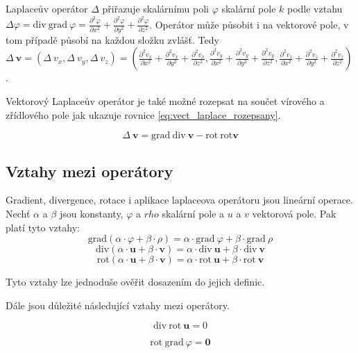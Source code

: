 \documentclass{book}
\newcommand{\vect}[1]{\boldsymbol{#1}}
\newcommand{\grad}{\mathrm{grad}}
\newcommand{\diverg}{\mathrm{div}}
\newcommand{\rot}{\mathrm{rot}}
\begin{document}
Laplaceův operátor \(\Delta\) přiřazuje skalárnímu poli \(\varphi\) skalární pole \(k\) podle vztahu \(\Delta \varphi = \diverg \ \grad \ \varphi = \frac{\partial^2 \varphi}{\partial x^2} + \frac{\partial^2 \varphi}{\partial y^2} + \frac{\partial^2 \varphi}{\partial z^2}\). Operátor může působit i na vektorové pole, v tom případě působí na každou složku zvlášť. Tedy \(\Delta \ \vect{v} = \left(\Delta \ v_x, \Delta \ v_y, \Delta \ v_z \right) = \left(\frac{\partial^2 v_x}{\partial x^2} + \frac{\partial^2 v_x}{\partial y^2} + \frac{\partial^2 v_x}{\partial z^2},
\frac{\partial^2 v_y}{\partial x^2} + \frac{\partial^2 v_y}{\partial y^2} + \frac{\partial^2 v_y}{\partial z^2},
\frac{\partial^2 v_z}{\partial x^2} + \frac{\partial^2 v_z}{\partial y^2} + \frac{\partial^2 v_z}{\partial z^2} \right)\).

Vektorový Laplaceův operátor je také možné rozepsat na součet vírového a zřídlového pole jak ukazuje rovnice \eqref{eq:vect_laplace_rozepsany}.

\begin{equation}
\label{eq:vect_laplace_rozepsany}
\Delta \ \vect{v} = \grad \ \diverg \ \vect{v} - \rot \ \rot \vect{v} 
\end{equation}

\subsection{Vztahy mezi operátory}

Gradient, divergence, rotace i aplikace laplaceova operátoru jsou lineární operace. Nechť \(\alpha\) a \(\beta\) jsou konstanty, \(\varphi\) a \(rho\) skalární pole a \(u\) a \(v\) vektorová pole. Pak platí tyto vztahy:
\[
\grad(\alpha \cdot \varphi + \beta \cdot \rho) = \alpha \cdot \grad \ \varphi + \beta \cdot \grad \ \rho
\]
\[
\diverg(\alpha \cdot \vect{u} + \beta \cdot \vect{v}) = \alpha \cdot \diverg \ \vect{u} + \beta \cdot \diverg \ \vect{v}
\]
\[
\rot(\alpha \cdot \vect{u} + \beta \cdot \vect{v}) = \alpha \cdot \rot \ \vect{u} + \beta \cdot \rot \ \vect{v}
\]

Tyto vztahy lze jednoduše ověřit dosazením do jejich definic.

Dále jsou důležité následující vztahy mezi operátory.

\begin{equation}
\label{eq:div_rot}
\diverg \ \rot \ \vect{u} = 0
\end{equation}

\begin{equation}
\label{eq:rot_grad}
\rot \ \grad \ \varphi = \vect{0}
\end{equation}
\end{document}
